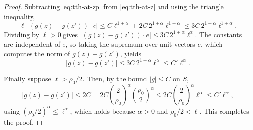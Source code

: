\begin{proof}
Subtracting \eqref{eq:tth-at-zp} from \eqref{eq:tth-at-z} and using the triangle
inequality,
\[
  \ell\,\bigl|(g(z)-g(z'))\cdot e\bigr|
   \le C\ell^{1+\alpha}+2C\,2^{1+\alpha}\ell^{1+\alpha}
   \le3C\,2^{1+\alpha}\ell^{1+\alpha}.
\]
Dividing by $\ell>0$ gives
$\bigl|(g(z)-g(z'))\cdot e\bigr|\le3C\,2^{1+\alpha}\ell^\alpha$. The constants
are independent of $e$, so taking the supremum over unit vectors $e$, which
computes the norm of $g(z)-g(z')$, yields
\[
  |g(z)-g(z')|\le3C\,2^{1+\alpha}\ell^\alpha\le C'\ell^\alpha .
\]

Finally suppose $\ell>\rho_0/2$. Then, by the bound $|g|\le C$ on $S$,
\[
  |g(z)-g(z')|\le2C
   =2C\left(\frac{2}{\rho_0}\right)^\alpha
     \left(\frac{\rho_0}{2}\right)^\alpha
   \le2C\left(\frac{2}{\rho_0}\right)^\alpha\ell^\alpha
   \le C'\ell^\alpha ,
\]
using $(\rho_0/2)^\alpha\le\ell^\alpha$, which holds because $\alpha>0$ and
$\rho_0/2<\ell$. This completes the proof.
\end{proof}
